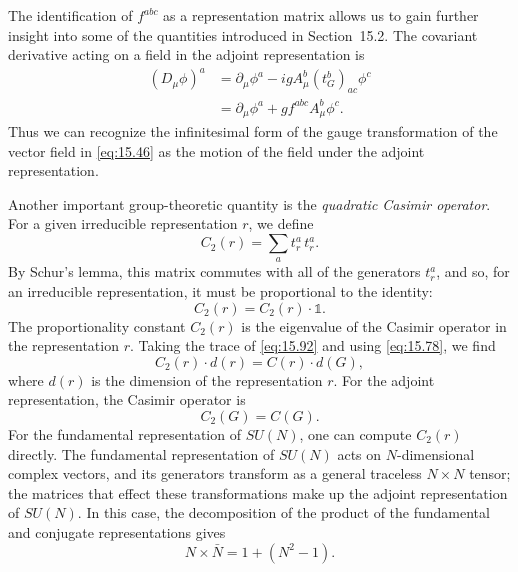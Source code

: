 The identification of $f^{abc}$ as a representation matrix allows us to gain
further insight into some of the quantities introduced in Section~15.2.  The
covariant derivative acting on a field in the adjoint representation is
\begin{equation}
  \begin{aligned}
    (D_\mu\phi)^a &= \partial_\mu\phi^a - igA_\mu^b(t^b_G)_{ac}\phi^c\\
    &= \partial_\mu\phi^a + gf^{abc}A_\mu^b\phi^c .
  \end{aligned}
  \label{eq:15.86}
\end{equation}
Thus we can recognize the infinitesimal form of the gauge transformation of
the vector field in \eqref{eq:15.46} as the motion of the field under the
adjoint representation.

Another important group-theoretic quantity is the \emph{quadratic Casimir
operator}.  For a given irreducible representation $r$, we define
\begin{equation}
  C_2(r) = \sum_a t^a_r\,t^a_r .
  \label{eq:15.92}
\end{equation}
By Schur's lemma, this matrix commutes with all of the generators $t^a_r$, and
so, for an irreducible representation, it must be proportional to the
identity:
\begin{equation}
  C_2(r) = C_2(r)\cdot\mathbb{1} .
  \label{eq:15.93}
\end{equation}
The proportionality constant $C_2(r)$ is the eigenvalue of the Casimir
operator in the representation $r$.  Taking the trace of \eqref{eq:15.92}
and using \eqref{eq:15.78}, we find
\begin{equation}
  C_2(r)\cdot d(r) = C(r)\cdot d(G) ,
  \label{eq:15.94}
\end{equation}
where $d(r)$ is the dimension of the representation $r$.  For the adjoint
representation, the Casimir operator is
\begin{equation}
  C_2(G) = C(G) .
\end{equation}
For the fundamental representation of $SU(N)$, one can compute $C_2(r)$
directly.  The fundamental representation of $SU(N)$ acts on $N$-dimensional
complex vectors, and its generators transform as a general traceless
$N\times N$ tensor; the matrices that effect these transformations make up
the adjoint representation of $SU(N)$.  In this case, the decomposition of
the product of the fundamental and conjugate representations gives
\begin{equation}
  N\times\bar{N} = 1 + (N^2-1) .
  \label{eq:15.102}
\end{equation}
